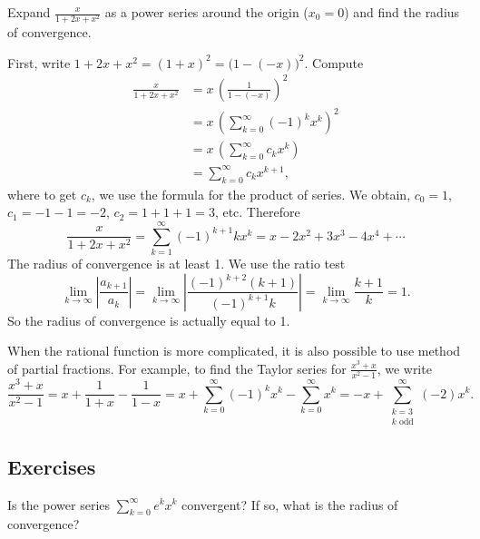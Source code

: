 \begin{example}
Expand $\frac{x}{1+2x+x^2}$ as a power series around the origin ($x_0 = 0$) and
find the radius of convergence.

First, write $1+2x+x^2 = {(1+x)}^2 = {\bigl(1-(-x)\bigr)}^2$.
Compute
\begin{equation*}
\begin{split}
\frac{x}{1+2x+x^2}
&=
x \,
{\left(
\frac{1}{1-(-x)}
\right)}^2
\\
&=
x \,
{ \left( 
\sum_{k=0}^\infty {(-1)}^k x^k 
\right)}^2
\\
&=
x \,
\left(
\sum_{k=0}^\infty c_k x^k 
\right)
\\
&=
\sum_{k=0}^\infty c_k x^{k+1} ,
\end{split}
\end{equation*}
where to get $c_k$, we use the formula for the product of series.  
We obtain, $c_0 = 1$, $c_1 = -1 -1 = -2$, $c_2 = 1+1+1 = 3$, etc.
Therefore
\begin{equation*}
\frac{x}{1+2x+x^2}
=
\sum_{k=1}^\infty {(-1)}^{k+1} k x^k
= x-2x^2+3x^3-4x^4+\cdots
\end{equation*}
The radius of convergence is at least 1.  We use the ratio test
\begin{equation*}
\lim_{k\to\infty}
\left\lvert \frac{a_{k+1}}{a_k} \right\rvert
=
\lim_{k\to\infty}
\left\lvert \frac{{(-1)}^{k+2} (k+1)}{{(-1)}^{k+1}k} \right\rvert
=
\lim_{k\to\infty}
\frac{k+1}{k}
= 1 .
\end{equation*}
So the radius of convergence is actually equal to 1.
\end{example}

When the rational function is more complicated, it is also possible
to use method of partial fractions.  For example,
to find the Taylor series for $\frac{x^3+x}{x^2-1}$, we write
\begin{equation*}
\frac{x^3+x}{x^2-1}
=
x + \frac{1}{1+x} - \frac{1}{1-x}
=
x + \sum_{k=0}^\infty {(-1)}^k x^k - \sum_{k=0}^\infty x^k
=
- x + \sum_{\substack{k=3 \\ k \text{ odd}}}^\infty (-2) x^k .
\end{equation*}

\subsection{Exercises}

\begin{exercise}
Is the power series $\displaystyle \sum_{k=0}^\infty e^k x^k$ convergent?
If so, what is the radius of convergence?
\end{exercise}

